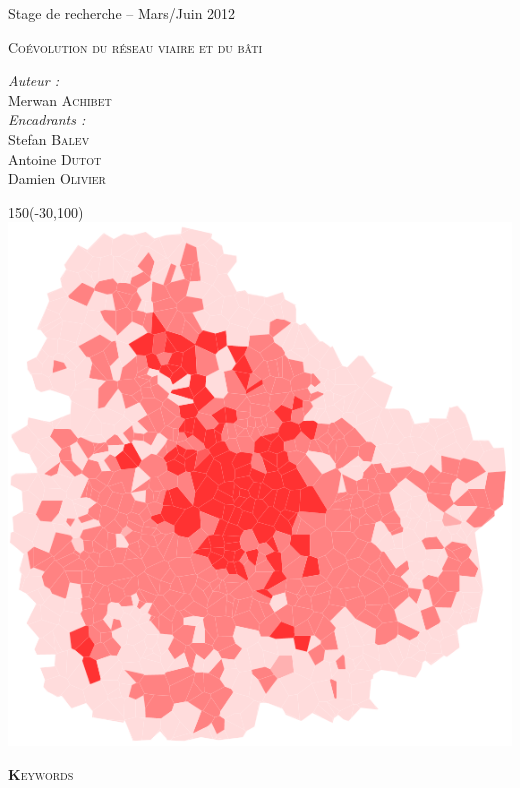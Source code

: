 \documentclass[12pt]{article}
\begin{document}
\begin{titlepage}

  Stage de recherche -- Mars/Juin 2012

  {\Large \textsc{Coévolution du réseau viaire et du bâti}}

  \begin{flushright}
    \textit{Auteur :}\\
    Merwan {\scshape Achibet}\\[0.5cm]
    \textit{Encadrants :}\\
    Stefan {\scshape Balev}\\
    Antoine {\scshape Dutot}\\
    Damien {\scshape Olivier}
  \end{flushright}

  \vfill

  \begin{textblock}{150}(-30,100)
    \includegraphics[]{images/cover.png}
  \end{textblock}

\end{titlepage}

\begin{center}
  {\scshape\textbf Keywords}
\end{center}
\end{document}
